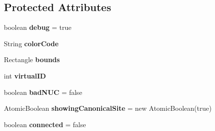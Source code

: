 \subsection*{Protected Attributes}
\begin{DoxyCompactItemize}
\item 
\hypertarget{classgov_1_1fnal_1_1ppd_1_1dd_1_1display_1_1client_1_1ConnectionToBrowserInstance_a57bceb8b82e134109a2508b5d7832065}{boolean {\bfseries debug} = true}\label{classgov_1_1fnal_1_1ppd_1_1dd_1_1display_1_1client_1_1ConnectionToBrowserInstance_a57bceb8b82e134109a2508b5d7832065}

\item 
\hypertarget{classgov_1_1fnal_1_1ppd_1_1dd_1_1display_1_1client_1_1ConnectionToBrowserInstance_a487fdde372e9eaafe1b9a7f83d43db23}{String {\bfseries color\-Code}}\label{classgov_1_1fnal_1_1ppd_1_1dd_1_1display_1_1client_1_1ConnectionToBrowserInstance_a487fdde372e9eaafe1b9a7f83d43db23}

\item 
\hypertarget{classgov_1_1fnal_1_1ppd_1_1dd_1_1display_1_1client_1_1ConnectionToBrowserInstance_a770b2f3f6f6e76626e45f2d73b23bd52}{Rectangle {\bfseries bounds}}\label{classgov_1_1fnal_1_1ppd_1_1dd_1_1display_1_1client_1_1ConnectionToBrowserInstance_a770b2f3f6f6e76626e45f2d73b23bd52}

\item 
\hypertarget{classgov_1_1fnal_1_1ppd_1_1dd_1_1display_1_1client_1_1ConnectionToBrowserInstance_a46edc5a7bac5d819516ff0092d7478e8}{int {\bfseries virtual\-I\-D}}\label{classgov_1_1fnal_1_1ppd_1_1dd_1_1display_1_1client_1_1ConnectionToBrowserInstance_a46edc5a7bac5d819516ff0092d7478e8}

\item 
\hypertarget{classgov_1_1fnal_1_1ppd_1_1dd_1_1display_1_1client_1_1ConnectionToBrowserInstance_aefdf61dc2db3974e98e8b1bc1fcd1807}{boolean {\bfseries bad\-N\-U\-C} = false}\label{classgov_1_1fnal_1_1ppd_1_1dd_1_1display_1_1client_1_1ConnectionToBrowserInstance_aefdf61dc2db3974e98e8b1bc1fcd1807}

\item 
\hypertarget{classgov_1_1fnal_1_1ppd_1_1dd_1_1display_1_1client_1_1ConnectionToBrowserInstance_a12d7a10dc47c1461bfa3bb74321330b3}{Atomic\-Boolean {\bfseries showing\-Canonical\-Site} = new Atomic\-Boolean(true)}\label{classgov_1_1fnal_1_1ppd_1_1dd_1_1display_1_1client_1_1ConnectionToBrowserInstance_a12d7a10dc47c1461bfa3bb74321330b3}

\item 
\hypertarget{classgov_1_1fnal_1_1ppd_1_1dd_1_1display_1_1client_1_1ConnectionToBrowserInstance_a172b06dd963b6eac021f63cda74cab54}{boolean {\bfseries connected} = false}\label{classgov_1_1fnal_1_1ppd_1_1dd_1_1display_1_1client_1_1ConnectionToBrowserInstance_a172b06dd963b6eac021f63cda74cab54}


\end{DoxyCompactItemize}
